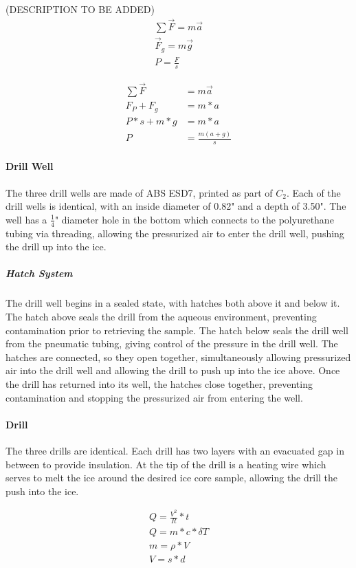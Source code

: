 \documentclass{article}
\begin{document}
(DESCRIPTION TO BE ADDED)
\begin{gather*}
    \sum \vec{F} = m \vec{a} \\
    \vec{F}_g = m \vec{g}\\
    P = \frac{F}{s}
\end{gather*}

\begin{align*}
    \sum \vec{F} &= m \vec{a} \\
    F_P + F_g &= m*a \\
    P*s + m*g &= m*a \\
    P &= \frac{m (a+g)}{s}
\end{align*}

\paragraph{Drill Well}
The three drill wells are made of ABS ESD7, printed as part of $C_2$. Each of the drill wells is identical, with an inside diameter of 0.82" and a depth of 3.50". The well has a $\frac{1}{4}$" diameter hole in the bottom which connects to the polyurethane tubing via threading, allowing the pressurized air to enter the drill well, pushing the drill up into the ice.
\subparagraph{Hatch System}
The drill well begins in a sealed state, with hatches both above it and below it. The hatch above seals the drill from the aqueous environment, preventing contamination prior to retrieving the sample. The hatch below seals the drill well from the pneumatic tubing, giving control of the pressure in the drill well. The hatches are connected, so they open together, simultaneously allowing pressurized air into the drill well and allowing the drill to push up into the ice above. Once the drill has returned into its well, the hatches close together, preventing contamination and stopping the pressurized air from entering the well.
\paragraph{Drill}
The three drills are identical. Each drill has two layers with an evacuated gap in between to provide insulation. At the tip of the drill is a heating wire which serves to melt the ice around the desired ice core sample, allowing the drill the push into the ice.

\begin{gather*}
    Q = \frac{V^2}{R}*t \\
    Q = m*c*\delta T \\
    m = \rho * V \\
    V = s*d \\
\end{gather*}
\end{document}
